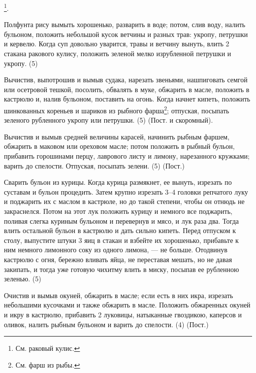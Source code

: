 \footnote{См. раковый кулис.}.

Полфунта рису вымыть хорошенько, разварить в воде; потом, слив воду, налить бульоном, положить небольшой кусок ветчины и разных трав: укропу, петрушки и кервелю. Когда суп довольно уварится, травы и ветчину вынуть, влить 2 стакана ракового кулису, положить зеленой мелко изрубленной петрушки и укропу. (5)


Вычистив, выпотрошив и вымыв судака, нарезать звеньями, нашпиговать семгой или осетровой тешкой, посолить, обвалять в муке, обжарить в масле, положить в кастрюлю и, налив бульоном, поставить на огонь. Когда начнет кипеть, положить шинкованных кореньев и шариков из рыбного фарша\footnote{См. фарш из рыбы.}; отпуская, посыпать зеленого рубленного укропу или петрушки. (5) (Пост. и скоромный).


Вычистив и вымыв средней величины карасей, начинить рыбным фаршем, обжарить в маковом или ореховом масле; потом положить в рыбный бульон, прибавить горошинами перцу, лаврового листу и лимону, нарезанного кружками; варить до спелости. Отпуская, посыпать зелени. (5) (Пост.)


Сварить бульон из курицы. Когда курица размякнет, ее вынуть, изрезать по суставам и бульон процедить. Затем крупно изрезать 3–4 головки репчатого луку и поджарить их с маслом в кастрюле, но до такой степени, чтобы он отнюдь не закраснелся. Потом на этот лук положить курицу и немного все поджарить, поливая слегка куриным бульоном и перевернув и мясо, и лук раза два. Тогда влить остальной бульон в кастрюлю и дать сильно кипеть. Перед отпуском к столу, выпустите штуки 3 яиц в стакан и взбейте их хорошенько, прибавьте к ним немного лимонного соку из одного лимона, — не больше. Отодвинув кастрюлю с огня, бережно вливать яйца, не переставая мешать, но не давая закипать, и тогда уже готовую чихитму влить в миску, посыпав ее рубленною зеленью. (5)


Очистив и вымыв окуней, обжарить в масле; если есть в них икра, изрезать небольшими кусочками и также обжарить в масле. Положить обжаренных окуней и икру в кастрюлю, прибавить 2 луковицы, натыканные гвоздикою, каперсов и оливок, налить рыбным бульоном и варить до спелости. (4) (Пост.)

